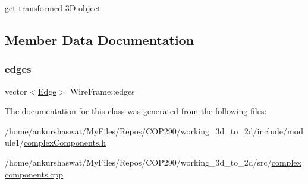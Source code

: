 get transformed 3D object 

\subsection{Member Data Documentation}
\mbox{\label{classWireFrame_a95f1653c5b972aa8514d34c0b7633d75}} 
\subsubsection{\texorpdfstring{edges}{edges}}
{\footnotesize\ttfamily vector$<$\hyperlink{structEdge}{Edge}$>$ Wire\+Frame\+::edges}



The documentation for this class was generated from the following files\+:\begin{DoxyCompactItemize}
\item 
/home/ankurshaswat/\+My\+Files/\+Repos/\+C\+O\+P290/working\+\_\+3d\+\_\+to\+\_\+2d/include/module1/\hyperlink{complexComponents_8h}{complex\+Components.\+h}\item 
/home/ankurshaswat/\+My\+Files/\+Repos/\+C\+O\+P290/working\+\_\+3d\+\_\+to\+\_\+2d/src/\hyperlink{complexcomponents_8cpp}{complexcomponents.\+cpp}\end{DoxyCompactItemize}
